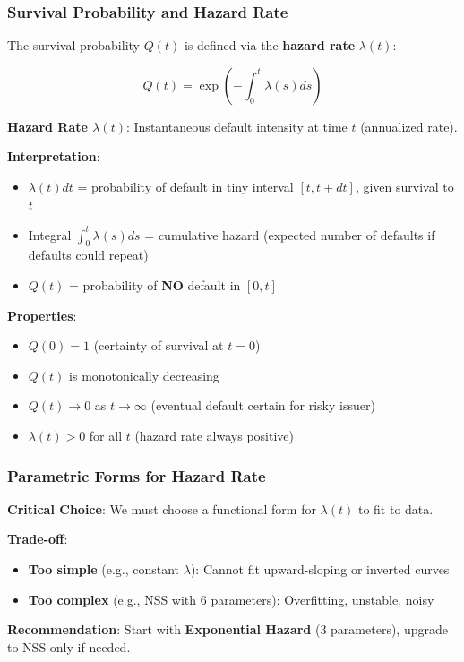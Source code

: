 \documentclass[11pt,a4paper]{article}
\begin{document}
\subsubsection{Survival Probability and Hazard Rate}

\begin{implbox}
The survival probability $Q(t)$ is defined via the \textbf{hazard rate} $\lambda(t)$:

\begin{equation}
Q(t) = \exp\left(-\int_0^t \lambda(s)ds\right)
\end{equation}

\textbf{Hazard Rate $\lambda(t)$}: Instantaneous default intensity at time $t$ (annualized rate).

\textbf{Interpretation}:
\begin{itemize}
    \item $\lambda(t) dt$ = probability of default in tiny interval $[t, t+dt]$, given survival to $t$
    \item Integral $\int_0^t \lambda(s)ds$ = cumulative hazard (expected number of defaults if defaults could repeat)
    \item $Q(t)$ = probability of \textbf{NO} default in $[0,t]$
\end{itemize}

\textbf{Properties}:
\begin{itemize}
    \item $Q(0) = 1$ (certainty of survival at $t=0$)
    \item $Q(t)$ is monotonically decreasing
    \item $Q(t) \to 0$ as $t \to \infty$ (eventual default certain for risky issuer)
    \item $\lambda(t) > 0$ for all $t$ (hazard rate always positive)
\end{itemize}
\end{implbox}

\subsubsection{Parametric Forms for Hazard Rate}

\begin{warnbox}
\textbf{Critical Choice}: We must choose a functional form for $\lambda(t)$ to fit to data.

\textbf{Trade-off}:
\begin{itemize}
    \item \textbf{Too simple} (e.g., constant $\lambda$): Cannot fit upward-sloping or inverted curves
    \item \textbf{Too complex} (e.g., NSS with 6 parameters): Overfitting, unstable, noisy
\end{itemize}

\textbf{Recommendation}: Start with \textbf{Exponential Hazard} (3 parameters), upgrade to NSS only if needed.
\end{warnbox}
\end{document}
